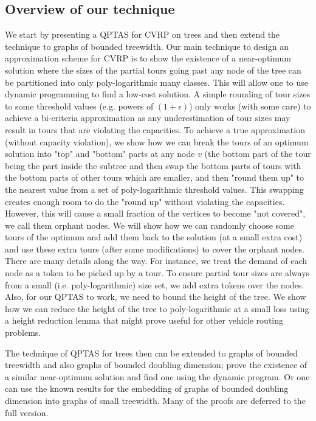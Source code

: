 \documentclass[twoside,leqno]{article}
\newcommand{\eps}{\epsilon}
\begin{document}
\subsection{Overview of our technique}
We start by presenting a QPTAS for CVRP on trees and then extend the technique to graphs of bounded
treewidth.
Our main technique to design an approximation scheme for CVRP is to show the existence of a near-optimum solution where the sizes of the partial tours going past any node of the tree can be partitioned into
only poly-logarithmic many classes. This will allow one to use dynamic programming to find a low-cost solution. A simple rounding of tour sizes to some threshold values (e.g. powers of $(1+\eps)$) only works (with some care) to achieve a
bi-criteria approximation as any underestimation of tour sizes may result in tours that are violating the capacities. To achieve a true approximation (without capacity violation), we show how we can break the tours of an optimum solution into "top" and "bottom" parts at any node $v$ (the bottom part of the tour being the part inside the subtree  and then swap the bottom parts of tours with the bottom parts of other tours which are smaller, and then "round them up" to the nearest value from a set of poly-logarithmic threshold values. This swapping creates enough room to do the "round up" without violating the capacities. However, this will cause a small fraction of the vertices to become "not covered", we call them  orphant nodes. We will show how we can randomly choose some tours of the optimum and add them back to the solution (at a small extra cost) and use these extra tours (after some modifications) to cover the orphant nodes. There are many details along the way. For instance, we treat the demand of each node as a token to be picked up by a tour. To ensure partial
tour sizes are always from a small (i.e. poly-logarithmic) size set, we add extra tokens over the nodes.
Also, for our QPTAS to work, we need to bound the height of the tree. We show how we can reduce the height of the tree to poly-logarithmic at a small loss using a height reduction lemma that might prove useful for other vehicle routing problems.

The technique of QPTAS for trees then can be extended to graphs of bounded treewidth and also graphs of bounded doubling dimension; prove the existence of a similar near-optimum solution and find one using the dynamic program. Or one can use the known results for the embedding of graphs of bounded doubling dimension into graphs of small treewidth.
Many of the proofs are deferred to the full version.
\end{document}
